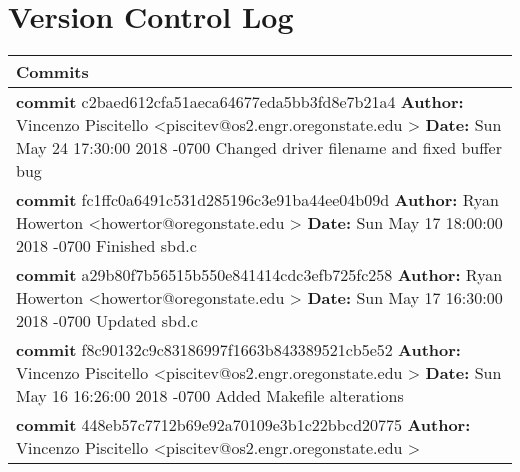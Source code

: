 \documentclass[10pt,draftclsnofoot,onecolumn]{IEEEtran}
\begin{document}
    \section{Version Control Log}
\begin{center}
        \begin{tabular}{ | p{14cm} | }
        \hline
        
        {\bf Commits }\\ \hline
        {\bf commit} c2baed612cfa51aeca64677eda5bb3fd8e7b21a4\newline
        {\bf Author:} Vincenzo Piscitello \textless piscitev@os2.engr.oregonstate.edu \textgreater \newline
        {\bf Date:}   Sun May 24 17:30:00 2018 -0700\newline
        \newline  Changed driver filename and fixed buffer bug \\ \hline
		{\bf commit} fc1ffc0a6491c531d285196c3e91ba44ee04b09d \newline
        {\bf Author:} Ryan Howerton \textless howertor@oregonstate.edu \textgreater \newline
        {\bf Date:}   Sun May 17 18:00:00 2018 -0700\newline
        \newline Finished sbd.c \\ \hline
		{\bf commit} a29b80f7b56515b550e841414cdc3efb725fc258 \newline
        {\bf Author:} Ryan Howerton \textless howertor@oregonstate.edu \textgreater \newline
        {\bf Date:}   Sun May 17 16:30:00 2018 -0700\newline
        \newline Updated sbd.c \\ \hline
		{\bf commit} f8c90132c9c83186997f1663b843389521cb5e52\newline
        {\bf Author:} Vincenzo Piscitello \textless piscitev@os2.engr.oregonstate.edu \textgreater \newline
        {\bf Date:}   Sun May 16 16:26:00 2018 -0700\newline
        \newline  Added Makefile alterations \\ \hline
		{\bf commit} 448eb57c7712b69e92a70109e3b1c22bbcd20775\newline
        {\bf Author:} Vincenzo Piscitello \textless piscitev@os2.engr.oregonstate.edu \textgreater \newline

\end{tabular}
\end{center}
\end{document}
